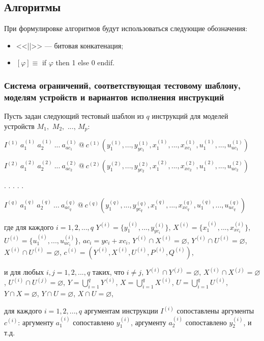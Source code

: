 \subsection{Алгоритмы}

При формулировке алгоритмов будут использоваться следующие обозначения:
\begin{itemize}
  \item <<||>> --- битовая конкатенация;
  \item $[\varphi] \equiv $ if $\varphi$ then 1 else 0 endif.
\end{itemize}

\subsubsection*{Система ограничений, соответствующая тестовому шаблону, моделям устройств и вариантов исполнения инструкций}

Пусть задан следующий тестовый шаблон из $q$ инструкций для моделей устройств $M_1,$ $M_2,$ ..., $M_p$:

$I^{(1)}~a_1^{(1)}~a_2^{(1)}~...~a_{ac_1}^{(1)}~\mbox{@}~c^{(1)}( y_1^{(1)}, ..., y_{yc_1}^{(1)}, x_1^{(1)}, ..., x_{xc_1}^{(1)}, u_1^{(1)}, ..., u_{uc_1}^{(1)})$

$I^{(2)}~a_1^{(2)}~a_2^{(2)}~...~a_{ac_2}^{(2)}~\mbox{@}~c^{(2)}( y_1^{(2)}, ..., y_{yc_2}^{(2)}, x_1^{(2)}, ..., x_{xc_2}^{(2)}, u_1^{(2)}, ..., u_{uc_2}^{(2)})$

. . . . .

$I^{(q)}~a_1^{(q)}~a_2^{(q)}~...~a_{ac_q}^{(q)}~\mbox{@}~c^{(q)}( y_1^{(q)}, ..., y_{yc_q}^{(q)}, x_1^{(q)}, ..., x_{xc_q}^{(q)}, u_1^{(q)}, ..., u_{uc_q}^{(q)})$

где для каждого $i = 1, 2, ..., q$ $Y^{(i)} = \{ y_1^{(i)}, ..., y_{yc_i}^{(i)} \}$, $X^{(i)} = \{ x_1^{(i)}, ..., x_{xc_i}^{(i)} \}$, $U^{(i)} = \{ u_1^{(i)}, ..., u_{uc_i}^{(i)} \}$, $ac_i = yc_i + xc_i$, $Y^{(i)} \cap X^{(i)} = \varnothing$, $Y^{(i)} \cap U^{(i)} = \varnothing$, $X^{(i)} \cap U^{(i)} = \varnothing$, $c^{(i)} = (Y^{(i)}, X^{(i)}, U^{(i)}, P^{(i)}, Q^{(i)})$,

и для любых $i, j = 1, 2, ..., q$ таких, что $i \neq j$, $Y^{(i)} \cap Y^{(j)} = \varnothing$, $X^{(i)} \cap X^{(j)} = \varnothing$, $U^{(i)} \cap U^{(j)} = \varnothing$, $Y = \bigcup_{i=1}^q Y^{(i)}$, $X = \bigcup_{i=1}^q X^{(i)}$, $U = \bigcup_{i=1}^q U^{(i)}$, $Y \cap X = \varnothing$, $Y \cap U = \varnothing$, $X \cap U = \varnothing$,

для каждого $i = 1, 2, ..., q$ аргументам инструкции $I^{(i)}$ сопоставлены аргументы $c^{(i)}$: аргументу $a_1^{(i)}$ сопоставлено $y_1^{(i)}$, аргументу $a_2^{(i)}$ сопоставлено $y_2^{(i)}$, и т.д.


